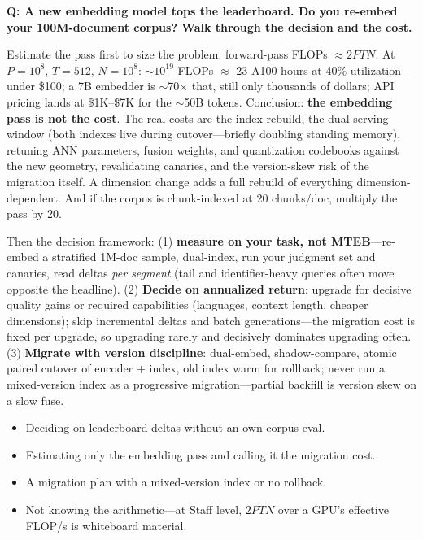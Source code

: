 \begin{interviewq}
\textbf{Q: A new embedding model tops the leaderboard. Do you re-embed your 100M-document corpus? Walk through the decision and the cost.}

 \quad {} \quad \badgefreq{\freqmed}

\stronganswer

Estimate the pass first to size the problem: forward-pass FLOPs $\approx 2PTN$. At $P{=}10^8$, $T{=}512$, $N{=}10^8$: $\sim$$10^{19}$ FLOPs $\approx$ 23 A100-hours at 40\% utilization---under \$100; a 7B embedder is $\sim$70$\times$ that, still only thousands of dollars; API pricing lands at \$1K--\$7K for the $\sim$50B tokens. Conclusion: \textbf{the embedding pass is not the cost}. The real costs are the index rebuild, the dual-serving window (both indexes live during cutover---briefly doubling standing memory), retuning ANN parameters, fusion weights, and quantization codebooks against the new geometry, revalidating canaries, and the version-skew risk of the migration itself. A dimension change adds a full rebuild of everything dimension-dependent. And if the corpus is chunk-indexed at 20 chunks/doc, multiply the pass by 20.

Then the decision framework: (1) \textbf{measure on your task, not MTEB}---re-embed a stratified 1M-doc sample, dual-index, run your judgment set and canaries, read deltas \textit{per segment} (tail and identifier-heavy queries often move opposite the headline). (2) \textbf{Decide on annualized return}: upgrade for decisive quality gains or required capabilities (languages, context length, cheaper dimensions); skip incremental deltas and batch generations---the migration cost is fixed per upgrade, so upgrading rarely and decisively dominates upgrading often. (3) \textbf{Migrate with version discipline}: dual-embed, shadow-compare, atomic paired cutover of encoder + index, old index warm for rollback; never run a mixed-version index as a progressive migration---partial backfill is version skew on a slow fuse.

\redflags
\begin{itemize}
    \item Deciding on leaderboard deltas without an own-corpus eval.
    \item Estimating only the embedding pass and calling it the migration cost.
    \item A migration plan with a mixed-version index or no rollback.
    \item Not knowing the arithmetic---at Staff level, $2PTN$ over a GPU's effective FLOP/s is whiteboard material.
\end{itemize}


\end{interviewq}
